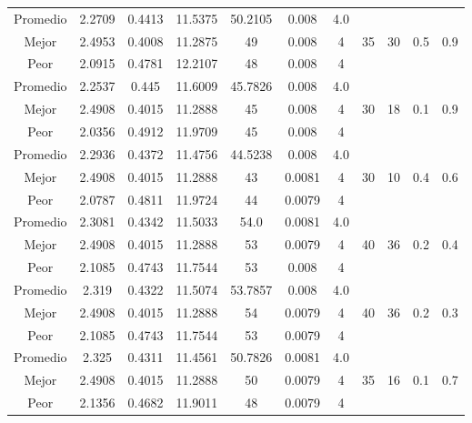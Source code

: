 \begin{table}[h!]
\begin{center}
\begin{tabular}{|c|c|c|c|c|c|c|c|c|c|c|}
        \hline
        \hline
            Promedio  & 2.2709 & 0.4413 & 11.5375 & 50.2105 & 0.008 & 4.0 &  &  &  & \\
            \cline{1-7}
            Mejor & 2.4953 & 0.4008  & 11.2875 & 49 & 0.008 & 4 & 35 & 30 & 0.5 & 0.9\\
            \cline{1-7}
            Peor & 2.0915 & 0.4781  & 12.2107 & 48 & 0.008 & 4 &  &  &  & \\
        \hline
        \hline
            Promedio  & 2.2537 & 0.445 & 11.6009 & 45.7826 & 0.008 & 4.0 &  &  &  & \\
            \cline{1-7}
            Mejor & 2.4908 & 0.4015  & 11.2888 & 45 & 0.008 & 4 & 30 & 18 & 0.1 & 0.9\\
            \cline{1-7}
            Peor & 2.0356 & 0.4912  & 11.9709 & 45 & 0.008 & 4 &  &  &  & \\
        \hline
        \hline
            Promedio  & 2.2936 & 0.4372 & 11.4756 & 44.5238 & 0.008 & 4.0 &  &  &  & \\
            \cline{1-7}
            Mejor & 2.4908 & 0.4015  & 11.2888 & 43 & 0.0081 & 4 & 30 & 10 & 0.4 & 0.6\\
            \cline{1-7}
            Peor & 2.0787 & 0.4811  & 11.9724 & 44 & 0.0079 & 4 &  &  &  & \\
        \hline
        \hline
            Promedio  & 2.3081 & 0.4342 & 11.5033 & 54.0 & 0.0081 & 4.0 &  &  &  & \\
            \cline{1-7}
            Mejor & 2.4908 & 0.4015  & 11.2888 & 53 & 0.0079 & 4 & 40 & 36 & 0.2 & 0.4\\
            \cline{1-7}
            Peor & 2.1085 & 0.4743  & 11.7544 & 53 & 0.008 & 4 &  &  &  & \\
        \hline
        \hline
            Promedio  & 2.319 & 0.4322 & 11.5074 & 53.7857 & 0.008 & 4.0 &  &  &  & \\
            \cline{1-7}
            Mejor & 2.4908 & 0.4015  & 11.2888 & 54 & 0.0079 & 4 & 40 & 36 & 0.2 & 0.3\\
            \cline{1-7}
            Peor & 2.1085 & 0.4743  & 11.7544 & 53 & 0.0079 & 4 &  &  &  & \\
        \hline
        \hline
            Promedio  & 2.325 & 0.4311 & 11.4561 & 50.7826 & 0.0081 & 4.0 &  &  &  & \\
            \cline{1-7}
            Mejor & 2.4908 & 0.4015  & 11.2888 & 50 & 0.0079 & 4 & 35 & 16 & 0.1 & 0.7\\
            \cline{1-7}
            Peor & 2.1356 & 0.4682  & 11.9011 & 48 & 0.0079 & 4 &  &  &  & \\

\end{tabular}
\end{center}
\end{table}
